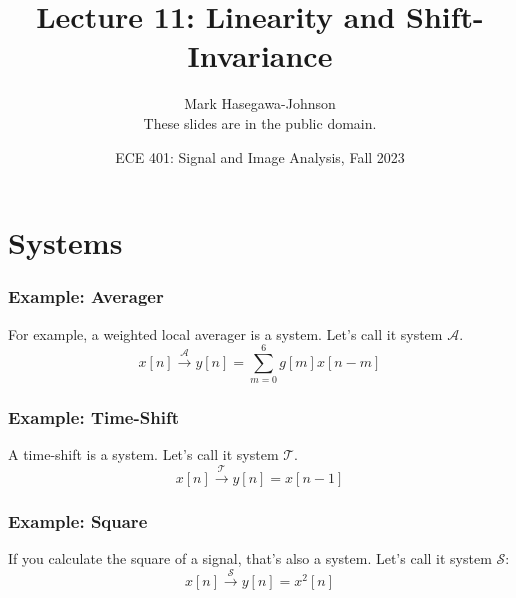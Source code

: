 \documentclass{beamer}
\title{Lecture 11: Linearity and Shift-Invariance}
\author{Mark Hasegawa-Johnson\\These slides are in the public domain.}
\date{ECE 401: Signal and Image Analysis, Fall 2023}
\begin{document}
\begin{frame}
  \maketitle
\end{frame}

\begin{frame}
  \tableofcontents
\end{frame}

\section[Systems]{Systems}
\setcounter{subsection}{1}


\begin{frame}
  \frametitle{Example: Averager}

  For example, a weighted local averager is a system.  Let's call it
  system ${\mathcal A}$.
  \[
  x[n]\stackrel{\mathcal A}{\longrightarrow} y[n]=\sum_{m=0}^6 g[m] x[n-m]
  \]
\end{frame}

\begin{frame}
  \frametitle{Example: Time-Shift}

  A time-shift is a system.  Let's call it
  system ${\mathcal T}$.
  \[
  x[n]\stackrel{\mathcal T}{\longrightarrow} y[n]=x[n-1]
  \]
\end{frame}

\begin{frame}
  \frametitle{Example: Square}

  If you calculate the square of a signal, that's also a system.
  Let's call it system ${\mathcal S}$:
  \[
  x[n]\stackrel{\mathcal S}{\longrightarrow} y[n]=x^2[n]
  \]
  
\end{frame}
\end{document}
